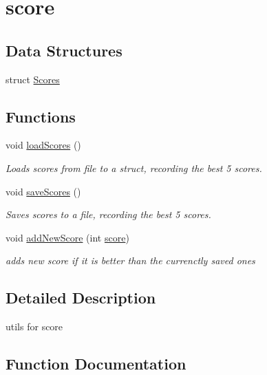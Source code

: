 \hypertarget{group__score}{}\section{score}
\label{group__score}
\subsection*{Data Structures}
\begin{DoxyCompactItemize}
\item 
struct \mbox{\hyperlink{struct_scores}{Scores}}
\end{DoxyCompactItemize}
\subsection*{Functions}
\begin{DoxyCompactItemize}
\item 
void \mbox{\hyperlink{group__score_ga1d81d36cfc183a1a1c8524facb3497aa}{load\+Scores}} ()
\begin{DoxyCompactList}\small\item\em Loads scores from file to a struct, recording the best 5 scores. \end{DoxyCompactList}\item 
void \mbox{\hyperlink{group__score_ga857943eead55a1059d11f95f7f1c936b}{save\+Scores}} ()
\begin{DoxyCompactList}\small\item\em Saves scores to a file, recording the best 5 scores. \end{DoxyCompactList}\item 
void \mbox{\hyperlink{group__score_ga9c2c75b1284995e5edb64e1381679730}{add\+New\+Score}} (int \mbox{\hyperlink{player_8c_a7aaf402558efbb864b266aff9bd517c1}{score}})
\begin{DoxyCompactList}\small\item\em adds new score if it is better than the currenctly saved ones \end{DoxyCompactList}\end{DoxyCompactItemize}


\subsection{Detailed Description}
utils for score 

\subsection{Function Documentation}
\mbox{\label{group__score_ga9c2c75b1284995e5edb64e1381679730}} 
